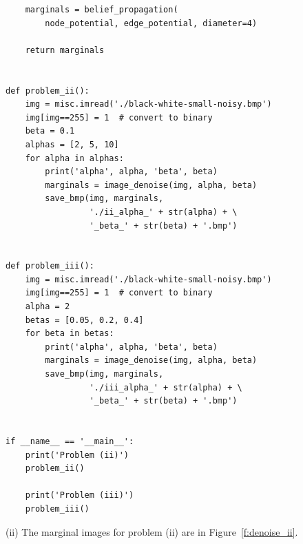 \documentclass{article}
\begin{document}
\begin{lstlisting}
    marginals = belief_propagation(
        node_potential, edge_potential, diameter=4)

    return marginals


def problem_ii():
    img = misc.imread('./black-white-small-noisy.bmp')
    img[img==255] = 1  # convert to binary
    beta = 0.1
    alphas = [2, 5, 10]
    for alpha in alphas:
        print('alpha', alpha, 'beta', beta)
        marginals = image_denoise(img, alpha, beta)
        save_bmp(img, marginals,
                 './ii_alpha_' + str(alpha) + \
                 '_beta_' + str(beta) + '.bmp')


def problem_iii():
    img = misc.imread('./black-white-small-noisy.bmp')
    img[img==255] = 1  # convert to binary
    alpha = 2
    betas = [0.05, 0.2, 0.4]
    for beta in betas:
        print('alpha', alpha, 'beta', beta)
        marginals = image_denoise(img, alpha, beta)
        save_bmp(img, marginals,
                 './iii_alpha_' + str(alpha) + \
                 '_beta_' + str(beta) + '.bmp')


if __name__ == '__main__':
    print('Problem (ii)')
    problem_ii()

    print('Problem (iii)')
    problem_iii()

\end{lstlisting}
(ii)
The marginal images for problem (ii) are in Figure~\ref{f:denoise_ii}.
\end{document}
